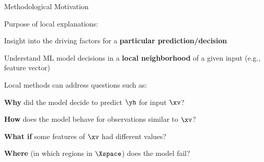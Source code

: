 \documentclass[10pt,compress,t,notes=noshow, xcolor=table]{beamer}
\begin{document}






\begin{framei}[align=top]{Methodological Motivation}
\item Purpose of local explanations:
\begin{itemizeS}
\item Insight into the driving factors for a \textbf{particular prediction/decision}
\item Understand ML model decisions in a \textbf{local neighborhood} of a given input (e.g., feature vector)
\end{itemizeS}
\spacer[0.25]
\pause
\item Local methods can address questions such as:
\begin{itemizeS}
\item \textbf{Why} did the model decide to predict $\yh$ for input $\xv$?
\item \textbf{How} does the model behave for observations similar to $\xv$?
\item \textbf{What if} some features of $\xv$ had different values?
\item \textbf{Where} (in which regions in $\Xspace$) does the model fail?
\end{itemizeS}
\end{framei}
\end{document}
